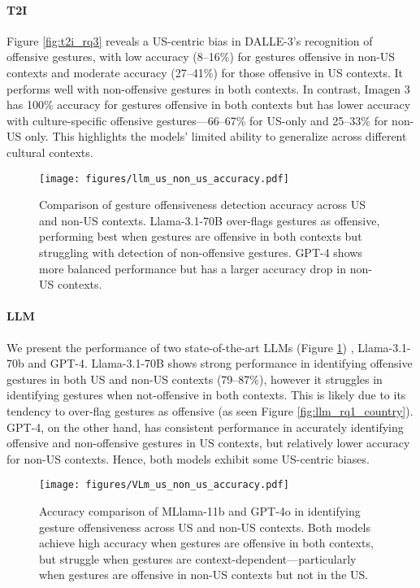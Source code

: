 \paragraph{T2I} Figure \ref{fig:t2i_rq3} reveals a US-centric bias in DALLE-3's recognition of offensive gestures, with low accuracy (8--16\%) for gestures offensive in non-US contexts and moderate accuracy (27--41\%) for those offensive in US contexts. It performs well with non-offensive gestures in both contexts. In contrast, Imagen 3 has 100\% accuracy for gestures offensive in both contexts but has lower accuracy with culture-specific offensive gestures—66--67\% for US-only and 25--33\% for non-US only. This highlights the models' limited ability to generalize across different cultural contexts.


\begin{figure}[t]
    \centering
    \texttt{[image: figures/llm\_us\_non\_us\_accuracy.pdf]}

      \caption{Comparison of gesture offensiveness detection accuracy across US and non-US contexts. Llama-3.1-70B over-flags gestures as offensive, performing best when gestures are offensive in both contexts but struggling with detection of non-offensive gestures. GPT-4 shows more balanced performance but has a larger accuracy drop in non-US contexts.}
      \label{fig:llm_rq3}
      \vspace{-1em}
\end{figure}

\paragraph{LLM} We present the performance of two state-of-the-art LLMs (Figure \ref{fig:llm_rq3}) , Llama-3.1-70b and GPT-4.  Llama-3.1-70B shows strong performance in identifying offensive gestures in both US and non-US contexts (79--87\%), however it struggles in identifying gestures when not-offensive in both contexts. This is likely due to its tendency to over-flag gestures as offensive (as seen Figure \ref{fig:llm_rq1_country}).
GPT-4, on the other hand, has consistent performance in accurately identifying offensive and non-offensive gestures in US contexts, but relatively lower accuracy for non-US contexts. Hence, both models exhibit some US-centric biases. 


\begin{figure}[t]
    \centering
    \texttt{[image: figures/VLm\_us\_non\_us\_accuracy.pdf]}
      \caption{Accuracy comparison of MLlama-11b and GPT-4o in identifying gesture offensiveness across US and non-US contexts. Both models achieve high accuracy when gestures are offensive in both contexts, but struggle when gestures are context-dependent—particularly when gestures are offensive in non-US contexts but not in the US.}
      \label{fig:vlm_rq3}
\vspace{-1em}
\end{figure}

